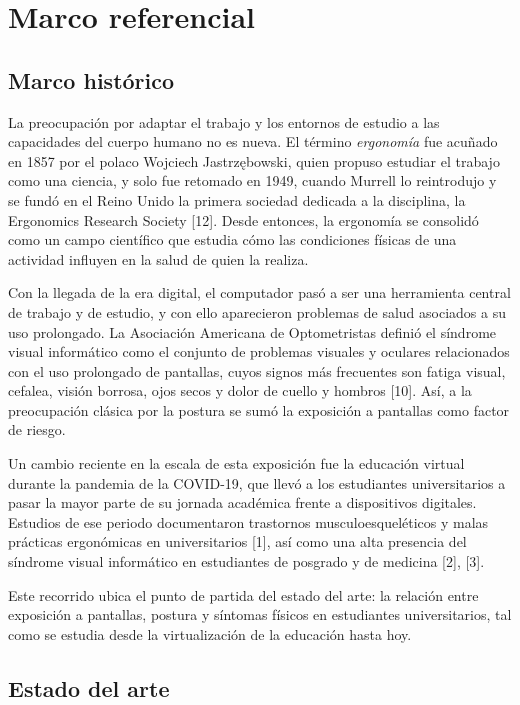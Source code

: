 \section{Marco referencial}

\subsection{Marco histórico}

La preocupación por adaptar el trabajo y los entornos de estudio a las capacidades del cuerpo humano no es nueva. El término \emph{ergonomía} fue acuñado en 1857 por el polaco Wojciech Jastrzębowski, quien propuso estudiar el trabajo como una ciencia, y solo fue retomado en 1949, cuando Murrell lo reintrodujo y se fundó en el Reino Unido la primera sociedad dedicada a la disciplina, la Ergonomics Research Society [12]. Desde entonces, la ergonomía se consolidó como un campo científico que estudia cómo las condiciones físicas de una actividad influyen en la salud de quien la realiza.

Con la llegada de la era digital, el computador pasó a ser una herramienta central de trabajo y de estudio, y con ello aparecieron problemas de salud asociados a su uso prolongado. La Asociación Americana de Optometristas definió el síndrome visual informático como el conjunto de problemas visuales y oculares relacionados con el uso prolongado de pantallas, cuyos signos más frecuentes son fatiga visual, cefalea, visión borrosa, ojos secos y dolor de cuello y hombros [10]. Así, a la preocupación clásica por la postura se sumó la exposición a pantallas como factor de riesgo.

Un cambio reciente en la escala de esta exposición fue la educación virtual durante la pandemia de la COVID-19, que llevó a los estudiantes universitarios a pasar la mayor parte de su jornada académica frente a dispositivos digitales. Estudios de ese periodo documentaron trastornos musculoesqueléticos y malas prácticas ergonómicas en universitarios [1], así como una alta presencia del síndrome visual informático en estudiantes de posgrado y de medicina [2], [3].

Este recorrido ubica el punto de partida del estado del arte: la relación entre exposición a pantallas, postura y síntomas físicos en estudiantes universitarios, tal como se estudia desde la virtualización de la educación hasta hoy.

\subsection{Estado del arte}


